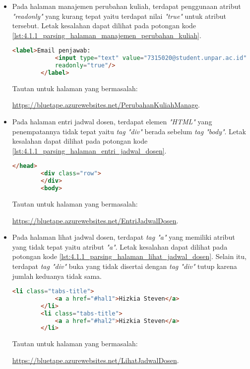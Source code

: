 \begin{itemize}
    \item Pada halaman manajemen perubahan kuliah, terdapat penggunaan atribut \textit{"readonly"} yang kurang tepat yaitu terdapat nilai \textit{"true"} untuk atribut tersebut. Letak kesalahan dapat dilihat pada potongan kode \ref{lst:4.1.1_parsing_halaman_manajemen_perubahan_kuliah}.
    \begin{lstlisting}[frame=single, label={lst:4.1.1_parsing_halaman_manajemen_perubahan_kuliah}, language=HTML, caption=Kriteria Sukses 4.1.1 - Kesalahan Elemen pada Halaman Manajemen Perubahan Kuliah]
        <label>Email penjawab:
            <input type="text" value="7315020@student.unpar.ac.id" 
            readonly="true"/>
        </label>
    \end{lstlisting}
    Tautan untuk halaman yang bermasalah: 
    
    \url{https://bluetape.azurewebsites.net/PerubahanKuliahManage}.

    \item Pada halaman entri jadwal dosen, terdapat elemen \textit{"HTML"} yang penempatannya tidak tepat yaitu \textit{tag "div"} berada sebelum \textit{tag "body"}. Letak kesalahan dapat dilihat pada potongan kode \ref{lst:4.1.1_parsing_halaman_entri_jadwal_dosen}.
    \begin{lstlisting}[frame=single, label={lst:4.1.1_parsing_halaman_entri_jadwal_dosen}, language=HTML, caption=Kriteria Sukses 4.1.1 - Kesalahan Elemen pada Halaman Entri Jadwal Dosen]
        </head>
        <div class="row">
        </div>        
        <body>
    \end{lstlisting}
    Tautan untuk halaman yang bermasalah: 
    
    \url{https://bluetape.azurewebsites.net/EntriJadwalDosen}.

    \item Pada halaman lihat jadwal dosen, terdapat \textit{tag "a"} yang memiliki atribut yang tidak tepat yaitu atribut \textit{"a"}. Letak kesalahan dapat dilihat pada potongan kode \ref{lst:4.1.1_parsing_halaman_lihat_jadwal_dosen}. Selain itu, terdapat \textit{tag "div"} buka yang tidak disertai dengan \textit{tag "div"} tutup karena jumlah keduanya tidak sama.
    \begin{lstlisting}[frame=single, label={lst:4.1.1_parsing_halaman_lihat_jadwal_dosen}, language=HTML, caption=Kriteria Sukses 4.1.1 - Kesalahan Elemen pada Halaman Lihat Jadwal Dosen]
        <li class="tabs-title">
            <a a href="#hal1">Hizkia Steven</a>
        </li>
        <li class="tabs-title">
            <a a href="#hal2">Hizkia Steven</a>
        </li>
    \end{lstlisting}
    Tautan untuk halaman yang bermasalah: 
    
    \url{https://bluetape.azurewebsites.net/LihatJadwalDosen}.

\end{itemize}

